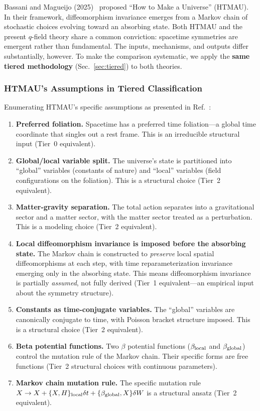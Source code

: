 \documentclass[aps,prd,twocolumn,showpacs,superscriptaddress,preprintnumbers]{revtex4-2}
\begin{document}
Bassani and Magueijo (2025)~\cite{Bassani:2025htma} proposed ``How to Make a Universe'' (HTMAU).
In their framework, diffeomorphism invariance emerges from a Markov chain of stochastic choices evolving toward an absorbing state.
Both HTMAU and the present $q$-field theory share a common conviction: spacetime symmetries are emergent rather than fundamental.
The inputs, mechanisms, and outputs differ substantially, however.
To make the comparison systematic, we apply the \textbf{same tiered methodology} (Sec.~\ref{sec:tiered}) to both theories.

\subsubsection{HTMAU's Assumptions in Tiered Classification}

Enumerating HTMAU's specific assumptions as presented in Ref.~\cite{Bassani:2025htma}:

\begin{enumerate}
    \item \textbf{Preferred foliation.} Spacetime has a preferred time foliation---a global time coordinate that singles out a rest frame. This is an irreducible structural input (Tier~0 equivalent).
    \item \textbf{Global/local variable split.} The universe's state is partitioned into ``global'' variables (constants of nature) and ``local'' variables (field configurations on the foliation). This is a structural choice (Tier~2 equivalent).
    \item \textbf{Matter-gravity separation.} The total action separates into a gravitational sector and a matter sector, with the matter sector treated as a perturbation. This is a modeling choice (Tier~2 equivalent).
    \item \textbf{Local diffeomorphism invariance is imposed before the absorbing state.} The Markov chain is constructed to \emph{preserve} local spatial diffeomorphisms at each step, with time reparameterization invariance emerging only in the absorbing state. This means diffeomorphism invariance is partially \emph{assumed}, not fully derived (Tier~1 equivalent---an empirical input about the symmetry structure).
    \item \textbf{Constants as time-conjugate variables.} The ``global'' variables are canonically conjugate to time, with Poisson bracket structure imposed. This is a structural choice (Tier~2 equivalent).
    \item \textbf{Beta potential functions.} Two $\beta$ potential functions ($\beta_{\rm local}$ and $\beta_{\rm global}$) control the mutation rule of the Markov chain. Their specific forms are free functions (Tier~2 structural choices with continuous parameters).
    \item \textbf{Markov chain mutation rule.} The specific mutation rule $X\to X+\{X,H\}_{\rm local}\delta t + \{\beta_{\rm global},X\}\delta W$ is a structural ansatz (Tier~2 equivalent).
\end{enumerate}
\end{document}
